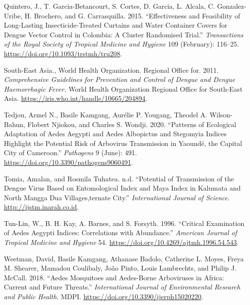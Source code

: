 \documentclass[
  letterpaper,
  twocolumn,
  landscape]{report}
\newlength{\cslhangindent}
\newenvironment{CSLReferences}[2] %
 {\begin{list}{}{%
  \setlength{\itemindent}{0pt}
  \setlength{\leftmargin}{0pt}
  \setlength{\parsep}{0pt}
  \ifodd #1
   \setlength{\leftmargin}{\cslhangindent}
   \setlength{\itemindent}{-1\cslhangindent}
  \fi
  \setlength{\itemsep}{#2\baselineskip}}}
 {\end{list}}
\begin{document}
\begin{CSLReferences}{1}{0}
Quintero, J., T. Garcia-Betancourt, S. Cortes, D. Garcia, L. Alcala, C.
Gonzalez-Uribe, H. Brochero, and G. Carrasquilla. 2015. {``Effectiveness
and Feasibility of Long-Lasting Insecticide-Treated Curtains and Water
Container Covers for Dengue Vector Control in Colombia: A Cluster
Randomised Trial.''} \emph{Transactions of the Royal Society of Tropical
Medicine and Hygiene} 109 (February): 116--25.
\url{https://doi.org/10.1093/trstmh/tru208}.

South-East Asia., World Health Organization. Regional Office for. 2011.
\emph{Comprehensive Guidelines for Prevention and Control of Dengue and
Dengue Haemorrhagic Fever.} World Health Organization Regional Office
for South-East Asia. \url{https://iris.who.int/handle/10665/204894}.

Tedjou, Armel N., Basile Kamgang, Aurélie P. Yougang, Theodel A.
Wilson-Bahun, Flobert Njiokou, and Charles S. Wondji. 2020. {``Patterns
of Ecological Adaptation of Aedes Aegypti and Aedes Albopictus and
Stegomyia Indices Highlight the Potential Risk of Arbovirus Transmission
in Yaoundé, the Capital City of Cameroon.''} \emph{Pathogens} 9 (June):
491. \url{https://doi.org/10.3390/pathogens9060491}.

Tomia, Amalan, and Rosmila Tuhatea. n.d. {``Potential of Transmission of
the Dengue Virus Based on Entomological Index and Maya Index in Kalumata
and North Mangga Dua Villages,ternate City.''} \emph{International
Journal of Science}. \url{http://ijstm.inarah.co.id}.

Tun-Lin, W., B. H. Kay, A. Barnes, and S. Forsyth. 1996. {``Critical
Examination of Aedes Aegypti Indices: Correlations with Abundance.''}
\emph{American Journal of Tropical Medicine and Hygiene} 54.
\url{https://doi.org/10.4269/ajtmh.1996.54.543}.

Weetman, David, Basile Kamgang, Athanase Badolo, Catherine L. Moyes,
Freya M. Shearer, Mamadou Coulibaly, João Pinto, Louis Lambrechts, and
Philip J. McCall. 2018. {``Aedes Mosquitoes and Aedes-Borne Arboviruses
in Africa: Current and Future Threats.''} \emph{International Journal of
Environmental Research and Public Health}. MDPI.
\url{https://doi.org/10.3390/ijerph15020220}.

\end{CSLReferences}
\end{document}
